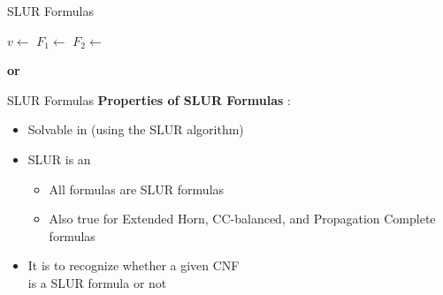 \documentclass[t]{sdqbeamer}
\begin{document}
\begin{frame}{SLUR Formulas}
	\begin{algorithm}[H]
		
		 {
			\Return \SAT
		}

		$v \leftarrow$  \;
		$F_1 \leftarrow$  \;
		$F_2 \leftarrow$  \;

		 {
			\Return \GIVEUP \;
		}
		 {
			\Return {} \;
		}
		 {
			\Return {} \;
		}
		\Return {} \textbf{or}   \;

		\caption{Single-lookahead Unit Resolution (SLUR)}
	\end{algorithm}
\end{frame}


\begin{frame}{SLUR Formulas}
	\textbf{Properties of SLUR Formulas} \cite{vcepek2012properties}:
	\begin{itemize}
		\item Solvable in  (using the SLUR algorithm)
		\item SLUR is an 
		\begin{itemize}
			\item All  formulas are SLUR formulas
			\item Also true for Extended Horn, CC-balanced, and Propagation Complete formulas
		\end{itemize}
		\pause
		\item It is  to recognize whether a given CNF\\
		is a SLUR formula or not
	\end{itemize}
\end{frame}
\end{document}
